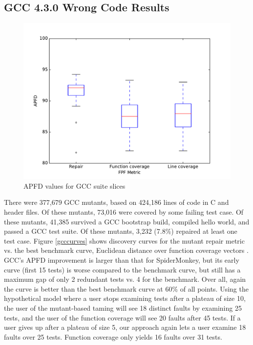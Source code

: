 \subsection{GCC 4.3.0 Wrong Code Results}


\begin{figure}
  \centering
  \includegraphics[width=0.8\columnwidth]{comparegcc}
  \caption{APFD values for GCC suite slices}
  \label{comparegcc}
\end{figure}%

There were 377,679 GCC mutants, based on 424,186 lines of code in C and header files. Of these mutants, 73,016 were covered by some failing test case.  Of these mutants, 41,385 survived a GCC bootstrap build, compiled hello world, and passed a GCC test suite.  Of these mutants, 3,232 (7.8\%) repaired at least one test case.  Figure \ref{gcccurves} shows discovery curves for the mutant repair metric vs. the best benchmark curve, Euclidean distance over function coverage vectors \cite{PLDI13}.  GCC's APFD improvement is larger than that for SpiderMonkey, but its early curve (first 15 tests) is worse compared to the benchmark curve, but still has a maximum gap of only 2 redundant tests vs. 4 for the benchmark.  Over all, again the curve is better than the best benchmark curve at 60\% of all points.  Using the hypothetical model where a user stops examining tests after a plateau of size 10, the user of the mutant-based taming will see 18 distinct faults by examining 25 tests, and the user of the function coverage will see 20 faults after 45 tests.  If a user gives up after a plateau of size 5, our approach again lets a user examine 18 faults over 25 tests.  Function coverage only yields 16 faults over 31 tests. 


